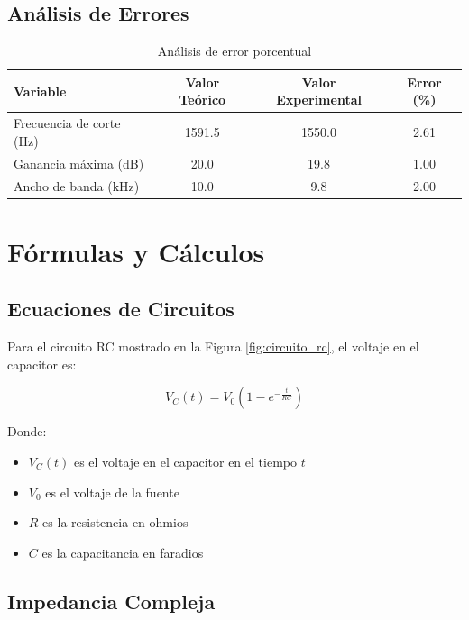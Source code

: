\documentclass[a4paper, 12pt]{article}
\begin{document}
\subsection{Análisis de Errores}

\begin{table}[H]
    \centering
    \caption{Análisis de error porcentual}
    \label{tab:errores}
    \begin{tabular}{l S[table-format=4.1] S[table-format=4.1] S[table-format=1.2]}
        \toprule
        \textbf{Variable} & {\textbf{Valor Teórico}} & {\textbf{Valor Experimental}} & {\textbf{Error (\si{\percent})}} \\
        \midrule
        Frecuencia de corte (\si{\hertz}) & 1591.5 & 1550.0 & 2.61 \\
        Ganancia máxima (\si{\deci\bel})   & 20.0   & 19.8   & 1.00 \\
        Ancho de banda (\si{\kilo\hertz})  & 10.0   & 9.8    & 2.00 \\
        \bottomrule
    \end{tabular}
\end{table}

\section{Fórmulas y Cálculos}

\subsection{Ecuaciones de Circuitos}

Para el circuito RC mostrado en la Figura \ref{fig:circuito_rc}, el voltaje en el capacitor es:

\[
V_C(t) = V_0 \left(1 - e^{-\frac{t}{RC}}\right)
\]

Donde:
\begin{itemize}
    \item $V_C(t)$ es el voltaje en el capacitor en el tiempo $t$
    \item $V_0$ es el voltaje de la fuente
    \item $R$ es la resistencia en ohmios
    \item $C$ es la capacitancia en faradios
\end{itemize}

\subsection{Impedancia Compleja}
\end{document}
